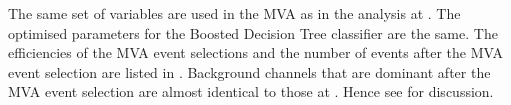 The same set of variables are used in the MVA as in the analysis at . The optimised parameters for the Boosted Decision Tree classifier are the same. The efficiencies of the MVA event selections and the number of events after the MVA event selection are listed in . Background channels that are dominant after the MVA event selection are almost identical to those at . Hence see  for discussion.

